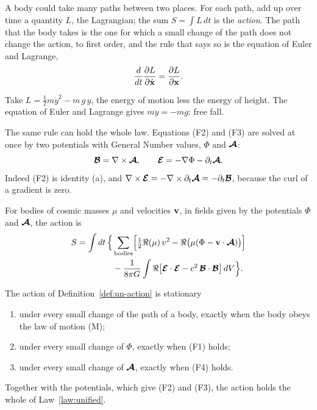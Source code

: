 A body could take many paths between two places. For each path, add up over time a quantity $L$, the Lagrangian; the sum $S = \int L\,dt$ is the \emph{action}. The path that the body takes is the one for which a small change of the path does not change the action, to first order, and the rule that says so is the equation of Euler and Lagrange,
\[
\frac{d}{dt}\frac{\partial L}{\partial\dot{\mathbf{x}}} = \frac{\partial L}{\partial\mathbf{x}} .
\]

\begin{workedexample}
Take $L = \tfrac12 m\dot{y}^2 - m\,g\,y$, the energy of motion less the energy of height. The equation of Euler and Lagrange gives $m\ddot{y} = -mg$: free fall.
\end{workedexample}

The same rule can hold the whole law. Equations (F2) and (F3) are solved at once by two potentials with General Number values, $\Phi$ and $\boldsymbol{\mathcal{A}}$:
\[
\boldsymbol{\mathcal{B}} = \nabla\times\boldsymbol{\mathcal{A}} , \qquad \boldsymbol{\mathcal{E}} = -\nabla\Phi - \partial_t\boldsymbol{\mathcal{A}} .
\]
Indeed (F2) is identity (a), and $\nabla\times\boldsymbol{\mathcal{E}} = -\nabla\times\partial_t\boldsymbol{\mathcal{A}} = -\partial_t\boldsymbol{\mathcal{B}}$, because the curl of a gradient is zero.

\begin{definition}\label{def:un-action}
For bodies of cosmic masses $\mu$ and velocities $\mathbf{v}$, in fields given by the potentials $\Phi$ and $\boldsymbol{\mathcal{A}}$, the action is
\begin{align*}
S = \int dt\,\Bigl\{&\sum_{\text{bodies}}\Bigl[\tfrac12\Re(\mu)\,v^2 - \Re\bigl(\mu(\Phi - \mathbf{v}\cdot\boldsymbol{\mathcal{A}})\bigr)\Bigr]\\
&- \frac{1}{8\pi G}\int\Re\bigl[\boldsymbol{\mathcal{E}}\cdot\boldsymbol{\mathcal{E}} - c^2\,\boldsymbol{\mathcal{B}}\cdot\boldsymbol{\mathcal{B}}\bigr]\,dV\Bigr\} .
\end{align*}
\end{definition}

\begin{theorem}\label{thm:un-action}
The action of Definition~\ref{def:un-action} is stationary
\begin{enumerate}
  \item under every small change of the path of a body, exactly when the body obeys the law of motion (M);
  \item under every small change of $\Phi$, exactly when (F1) holds;
  \item under every small change of $\boldsymbol{\mathcal{A}}$, exactly when (F4) holds.
\end{enumerate}
Together with the potentials, which give (F2) and (F3), the action holds the whole of Law~\ref{law:unified}.
\end{theorem}

